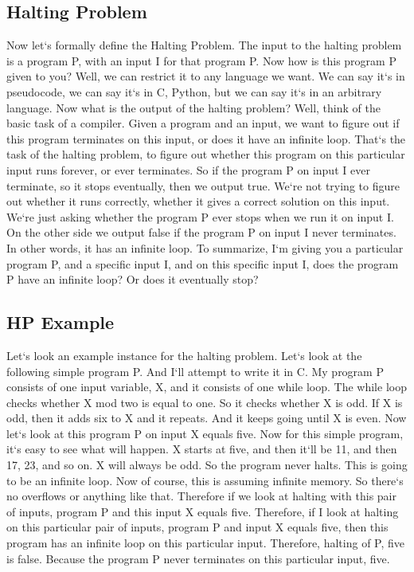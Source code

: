 \subsection{Halting Problem}
Now let`s formally define the Halting Problem.
The input to the halting problem is a program P, with an input I for that program P\@.
Now how is this program P given to you? Well, we can restrict it to any language we want.
We can say it`s in pseudocode, we can say it`s in C, Python, but we can say it`s in an arbitrary language.
Now what is the output of the halting problem? Well, think of the basic task of a compiler.
Given a program and an input, we want to figure out if this program terminates on this input, or does it have an infinite loop.
That`s the task of the halting problem, to figure out whether this program on this particular input runs forever, or ever terminates.
So if the program P on input I ever terminate, so it stops eventually, then we output true.
We`re not trying to figure out whether it runs correctly, whether it gives a correct solution on this input.
We`re just asking whether the program P ever stops when we run it on input I\@.
On the other side we output false if the program P on input I never terminates.
In other words, it has an infinite loop.
To summarize, I`m giving you a particular program P, and a specific input I, and on this specific input I, does the program P have an infinite loop? Or does it eventually stop?

\subsection{HP  Example}
Let`s look an example instance for the halting problem.
Let`s look at the following simple program P\@.
And I`ll attempt to write it in C\@.
My program P consists of one input variable, X, and it consists of one while loop.
The while loop checks whether X mod two is equal to one.
So it checks whether X is odd.
If X is odd, then it adds six to X and it repeats.
And it keeps going until X is even.
Now let`s look at this program P on input X equals five.
Now for this simple program, it`s easy to see what will happen.
X starts at five, and then it`ll be 11, and then 17, 23, and so on.
X will always be odd.
So the program never halts.
This is going to be an infinite loop.
Now of course, this is assuming infinite memory.
So there`s no overflows or anything like that.
Therefore if we look at halting with this pair of inputs, program P and this input X equals five.
Therefore, if I look at halting on this particular pair of inputs, program P and input X equals five, then this program has an infinite loop on this particular input.
Therefore, halting of P, five is false.
Because the program P never terminates on this particular input, five.

